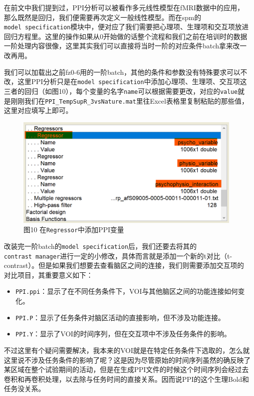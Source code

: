 \documentclass[
]{article}
\begin{document}
在前文中我们提到过，PPI分析可以被看作多元线性模型在fMRI数据中的应用，那么既然是回归，我们便需要再次定义一般线性模型。而在spm的\texttt{model\ specification}模块中，便对应了我们需要把心理项、生理项和交互项放进回归方程里。这里的操作如果从0开始做的话整个流程和我们之前在培训时的数据一阶处理内容很像，这里其实我们可以直接将当时一阶的对应条件batch拿来改一改再用。

我们可以加载出之前fz0-6用的一阶batch，其他的条件和参数没有特殊要求可以不改，这里PPI分析只是在\texttt{model\ specification}中添加心理项、生理项、交互项这三者的回归（如图10），每个变量的名字\texttt{name}可以根据需要更改，对应的\texttt{value}就是刚刚我们在\texttt{PPI\_TempSupR\_3vsNature.mat}里往Excel表格里复制粘贴的那些值，这里对应填写上即可。

\begin{figure}
\centering
\includegraphics[width=4.375in,height=\textheight]{adding_PPI_variables.png}
\caption{图10 在\texttt{Regressor}中添加PPI变量}
\end{figure}

改装完一阶batch的\texttt{model\ specification}后，我们还要去将其的\texttt{contrast\ manager}进行一定的小修改，具体而言就是添加一个新的t对比（t-contrast）。但是如果我们想要去查看脑区之间的连接，我们则需要添加交互项的对比项目，其重要意义如下：

\begin{itemize}
\item
  \texttt{PPI.ppi}：显示了在不同任务条件下，VOI与其他脑区之间的功能连接如何变化。
\item
  \texttt{PPI.P}：显示了任务条件对脑区活动的直接影响，但不涉及功能连接。
\item
  \texttt{PPI.Y}：显示了VOI的时间序列，但在交互项中不涉及任务条件的影响。
\end{itemize}

不过这里有个疑问需要解决，我本来的VOI就是在特定任务条件下选取的，怎么就这里说不涉及任务条件的影响了呢？这是因为尽管原始的时间序列虽然的确反映了某区域在整个试验期间的活动，但是在生成PPI文件的时候这个时间序列会经过去卷积和再卷积处理，以去除与任务时间的直接关系。因而说PPI的这个生理Bold和任务没关系。
\end{document}
